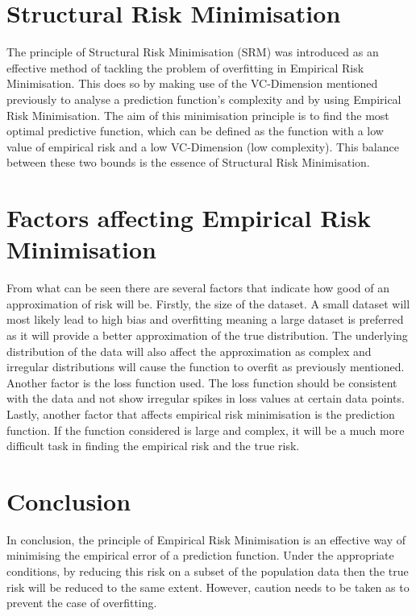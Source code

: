 \documentclass{article}
\begin{document}
\section{Structural Risk Minimisation}
The principle of Structural Risk Minimisation (SRM) was introduced as an effective method of tackling the problem of overfitting in Empirical Risk Minimisation. This does so by making use of the VC-Dimension mentioned previously to analyse a prediction function's complexity and by using Empirical Risk Minimisation. The aim of this minimisation principle is to find the most optimal predictive function, which can be defined as the function with a low value of empirical risk and a low VC-Dimension (low complexity). This balance between these two bounds is the essence of Structural Risk Minimisation.

\section{Factors affecting Empirical Risk Minimisation}

From what can be seen there are several factors that indicate how good of an approximation of risk will be. Firstly, the size of the dataset. A small dataset will most likely lead to high bias and overfitting meaning a large dataset is preferred as it will provide a better approximation of the true distribution. The underlying distribution of the data will also affect the approximation as complex and irregular distributions will cause the function to overfit as previously mentioned. Another factor is the loss function used. The loss function should be consistent with the data and not show irregular spikes in loss values at certain data points. Lastly, another factor that affects empirical risk minimisation is the prediction function. If the function considered is large and complex, it will be a much more difficult task in finding the empirical risk and the true risk. 

\section{Conclusion}
In conclusion, the principle of Empirical Risk Minimisation is an effective way of minimising the empirical error of a prediction function. Under the appropriate conditions, by reducing this risk on a subset of the population data then the true risk will be reduced to the same extent. However, caution needs to be taken as to prevent the case of overfitting.



\end{document}
